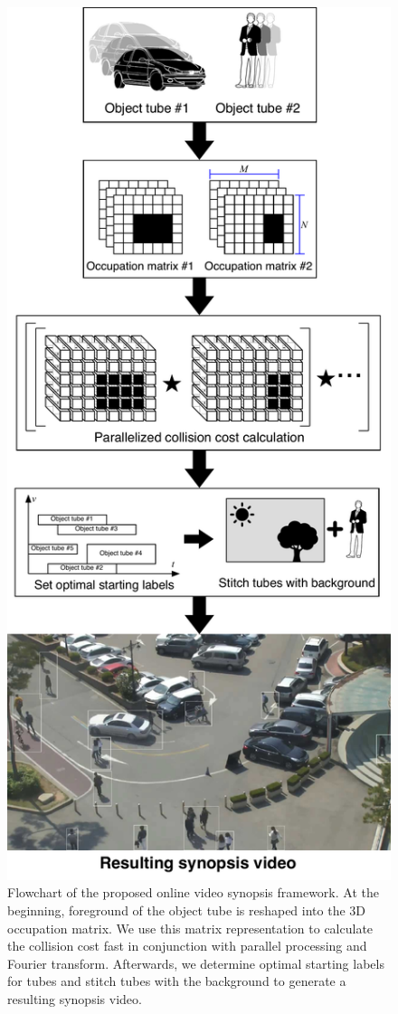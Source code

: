\documentclass[11pt]{hyu_thesis}
\begin{document}
\begin{figure}
\begin{center}
\includegraphics[height=0.8\textheight]{flowchart.pdf}
\end{center}
\caption{Flowchart of the proposed online video synopsis framework. At the beginning, foreground of the object tube is reshaped into the 3D occupation matrix. We use this matrix representation to calculate the collision cost fast in conjunction with parallel processing and Fourier transform. Afterwards, we determine optimal starting labels for tubes and stitch tubes with the background to generate a resulting synopsis video.}
\label{fig:flowchart}
\end{figure}
\end{document}

